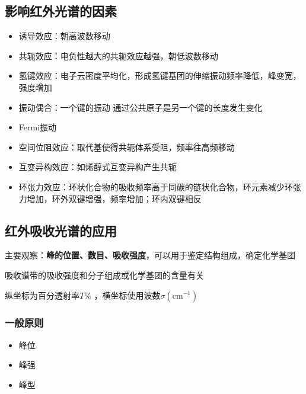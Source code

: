 \subsection{影响红外光谱的因素}%
\label{sub:影响红外光谱的因素}
\begin{itemize}
    \item 诱导效应：朝高波数移动
    \item 共轭效应：电负性越大的共轭效应越强，朝低波数移动
    \item 氢键效应：电子云密度平均化，形成氢键基团的伸缩振动频率降低，峰变宽，强度增加
    \item 振动偶合：一个键的振动 通过公共原子是另一个键的长度发生变化
    \item Fermi振动
    \item 空间位阻效应：取代基使得共轭体系受阻，频率往高频移动
    \item 互变异构效应：如烯醇式互变异构产生共轭
    \item 环张力效应：环状化合物的吸收频率高于同碳的链状化合物，环元素减少环张力增加，环外双键增强，频率增加；环内双键相反
\end{itemize}
\subsection{红外吸收光谱的应用}%
\label{sub:红外吸收光谱的应用}
主要观察：\textbf{峰的位置、数目、吸收强度}，可以用于鉴定结构组成，确定化学基团
\begin{notation}
    吸收谱带的吸收强度和分子组成或化学基团的含量有关
\end{notation}
纵坐标为百分透射率$T\%$ ，横坐标使用波数$\sigma\left( \text{cm}^{-1} \right)$
\subsubsection*{一般原则}%
\label{subsub*:一般原则}
\begin{itemize}
    \item 峰位
    \item 峰强
    \item 峰型
\end{itemize}

